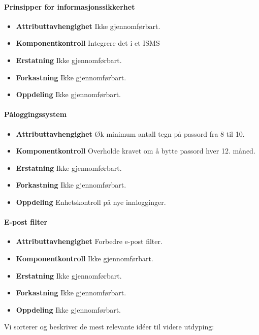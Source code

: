 \paragraph{Prinsipper for informasjonssikkerhet}
\begin{itemize}
    \item \textbf{Attributtavhengighet} Ikke gjennomførbart.
    \item \textbf{Komponentkontroll} Integrere det i et ISMS
    \item \textbf{Erstatning} Ikke gjennomførbart.
    \item \textbf{Forkastning} Ikke gjennomførbart.
    \item \textbf{Oppdeling} Ikke gjennomførbart.
\end{itemize}

\paragraph{Påloggingssystem}
\begin{itemize}
    \item \textbf{Attributtavhengighet} Øk minimum antall tegn på passord fra 8 til 10. 
    \item \textbf{Komponentkontroll} Overholde kravet om å bytte passord hver 12. måned.
    \item \textbf{Erstatning} Ikke gjennomførbart. 
    \item \textbf{Forkastning} Ikke gjennomførbart. 
    \item \textbf{Oppdeling} Enhetskontroll på nye innlogginger.
\end{itemize}

\paragraph{E-post filter}
\begin{itemize}
    \item \textbf{Attributtavhengighet} Forbedre e-post filter.
    \item \textbf{Komponentkontroll} Ikke gjennomførbart. 
    \item \textbf{Erstatning} Ikke gjennomførbart. 
    \item \textbf{Forkastning} Ikke gjennomførbart. 
    \item \textbf{Oppdeling} Ikke gjennomførbart. 
\end{itemize}

Vi sorterer og beskriver de mest relevante idéer til videre utdyping:

